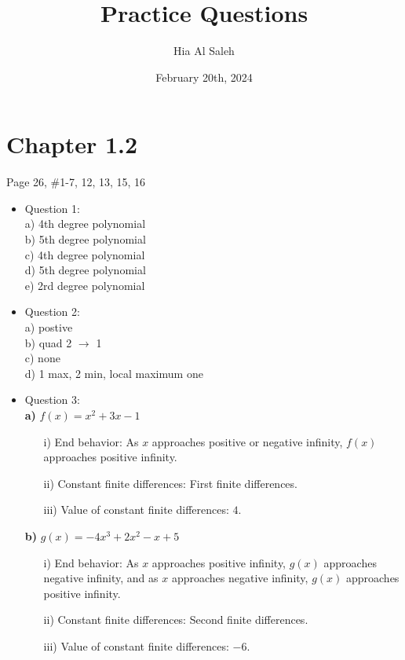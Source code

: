 \documentclass{article}
\title{Practice Questions}
\author{Hia Al Saleh}
\date{February 20th, 2024}
\begin{document}
\maketitle
\section*{Chapter 1.2}
Page 26, \#1-7, 12, 13, 15, 16
\begin{itemize}
    \item Question 1: \\
    a) 4th degree polynomial \\
    b) 5th degree polynomial \\
    c) 4th degree polynomial \\
    d) 5th degree polynomial \\
    e) 2rd degree polynomial \\
    
    \item Question 2: \\
    a) postive \\
    b) quad 2 $\to$ 1 \\ 
    c) none \\ 
    d) 1 max, 2 min, local maximum one \\ 
    
    \item Question 3:\\
\textbf{a)} $f(x) = x^2 +3x- 1$
\begin{enumerate}
    \item[i)] End behavior: As $x$ approaches positive or negative infinity, $f(x)$ approaches positive infinity.
    \item[ii)] Constant finite differences: First finite differences.
    \item[iii)] Value of constant finite differences: $4$.
\end{enumerate}

\textbf{b)} $g(x) =-4x^3+ 2x^2 - x + 5$
\begin{enumerate}
    \item[i)] End behavior: As $x$ approaches positive infinity, $g(x)$ approaches negative infinity, and as $x$ approaches negative infinity, $g(x)$ approaches positive infinity.
    \item[ii)] Constant finite differences: Second finite differences.
    \item[iii)] Value of constant finite differences: $-6$.
\end{enumerate}


\end{itemize}
\end{document}
